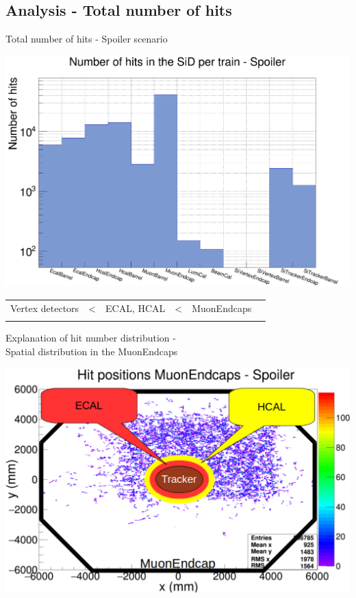 \documentclass[xcolor={dvipsnames}]{beamer}
\begin{document}
\subsection{Analysis - Total number of hits}
\begin{frame}{Total number of hits - Spoiler scenario}
 \begin{center}
\includegraphics[height=0.65\textheight]{Number_Hits_per_Subdetector.pdf}\\
\begin{tabular}{@{}p{}p{}p{}p{}p{}p{}@{}}
 \centering Vertex detectors & < & \centering ECAL, HCAL & < & \centering MuonEndcaps & \\
  \centering{\scriptsize Smallest effective detector area} & &  \centering{\scriptsize Particle showers} & &  \centering{\scriptsize Biggest effective detector area}&
\end{tabular}
\end{center}
\end{frame}
\begin{frame}{Explanation of hit number distribution -\\ \small Spatial distribution in the MuonEndcaps}
 \begin{center}
\includegraphics[height=0.78\textheight]{Explanation_Hits_Subdetectors.pdf}
\end{center}
\end{frame}
\end{document}
